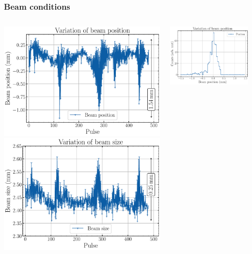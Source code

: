 \begin{frame}[t]
  \frametitle{Beam conditions}
  \begin{columns}[T]
    \begin{column}{0.45\textwidth}
      \includegraphics[width=1\textwidth]{04_Test/fig/fig000_variation_a}
      \includegraphics[width=1\textwidth]{04_Test/fig/fig000_variation_b}
    \end{column}
    \begin{column}{0.45\textwidth}
      \includegraphics[width=1\textwidth]{04_Test/fig/fig000_hist_variation_a}

\end{column}
\end{columns}
\end{frame}

